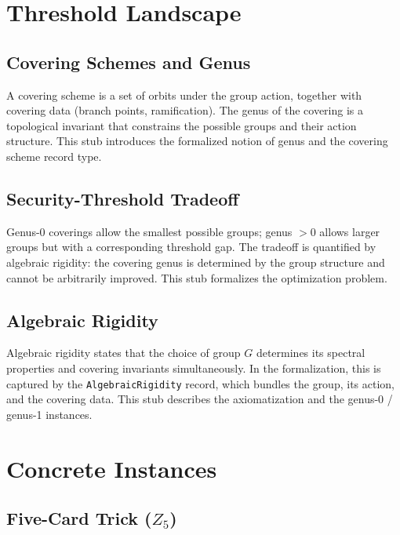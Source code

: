 \documentclass[11pt,a4paper]{article}
\begin{document}
\section{Threshold Landscape}
\label{sec:threshold}

\subsection{Covering Schemes and Genus}
\label{sec:covering}

A covering scheme is a set of orbits under the group action, together with covering data (branch points, ramification).
The genus of the covering is a topological invariant that constrains the possible groups and their action structure.
This stub introduces the formalized notion of genus and the covering scheme record type.

\subsection{Security-Threshold Tradeoff}
\label{sec:tradeoff}

Genus-0 coverings allow the smallest possible groups; genus $> 0$ allows larger groups but with a corresponding threshold gap.
The tradeoff is quantified by algebraic rigidity: the covering genus is determined by the group structure and cannot be arbitrarily improved.
This stub formalizes the optimization problem.

\subsection{Algebraic Rigidity}
\label{sec:rigidity}

Algebraic rigidity states that the choice of group $G$ determines its spectral properties and covering invariants simultaneously.
In the formalization, this is captured by the \texttt{AlgebraicRigidity} record, which bundles the group, its action, and the covering data.
This stub describes the axiomatization and the genus-0 / genus-1 instances.

\section{Concrete Instances}
\label{sec:instances}

\subsection{Five-Card Trick ($Z_5$)}
\label{sec:inst-z5}
\end{document}
